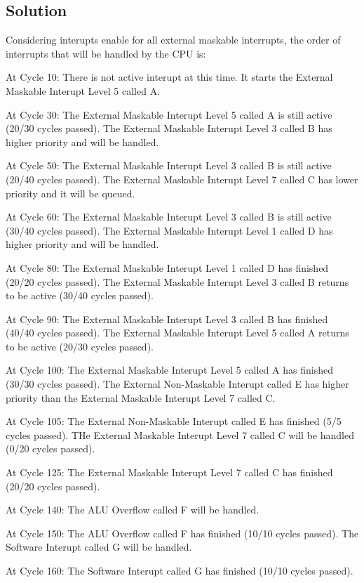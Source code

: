 \subsection*{Solution}

Considering interupts enable for all external maskable interrupts, the order of interrupts that will be handled by the CPU is:

At Cycle 10: There is not active interupt at this time. It starts the External Maskable Interupt Level 5 called A.

At Cycle 30: The External Maskable Interupt Level 5 called A is still active (20/30 cycles passed).
The External Maskable Interupt Level 3 called B has higher priority and will be handled.

At Cycle 50: The External Maskable Interupt Level 3 called B is still active (20/40 cycles passed). 
The External Maskable Interupt Level 7 called C has lower priority and it will be queued.

At Cycle 60: The External Maskable Interupt Level 3 called B is still active (30/40 cycles passed).
The External Maskable Interupt Level 1 called D has higher priority and will be handled.

At Cycle 80: The External Maskable Interupt Level 1 called D has finished (20/20 cycles passed).
The External Maskable Interupt Level 3 called B returns to be active (30/40 cycles passed).

At Cycle 90: The External Maskable Interupt Level 3 called B has finished (40/40 cycles passed).
The External Maskable Interupt Level 5 called A returns to be active (20/30 cycles passed).

At Cycle 100: The External Maskable Interupt Level 5 called A has finished (30/30 cycles passed).
The External Non-Maskable Interupt called E has higher priority than the External Maskable Interupt Level 7 called C.

At Cycle 105: The External Non-Maskable Interupt called E has finished (5/5 cycles passed).
THe External Maskable Interupt Level 7 called C will be handled (0/20 cycles passed).

At Cycle 125: The External Maskable Interupt Level 7 called C has finished (20/20 cycles passed).

At Cycle 140: The ALU Overflow called F will be handled.

At Cycle 150: The ALU Overflow called F has finished (10/10 cycles passed).
The Software Interupt called G will be handled.

At Cycle 160: The Software Interupt called G has finished (10/10 cycles passed).

